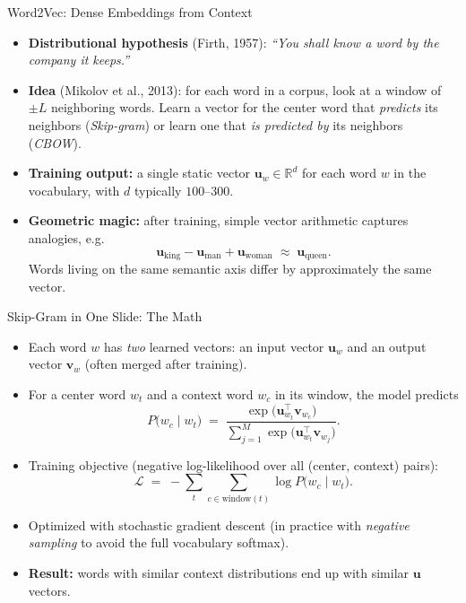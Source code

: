 \documentclass[10pt,english,aspectratio=169]{beamer}
\begin{document}
\begin{frame}{Word2Vec: Dense Embeddings from Context}
\begin{itemize}
\item \textbf{Distributional hypothesis} (Firth, 1957): \emph{``You shall know a word by the company it keeps.''}

\medskip
\item \textbf{Idea} (Mikolov et al., 2013): for each word in a corpus, look at a window of $\pm L$ neighboring words. Learn a vector for the center word that \emph{predicts} its neighbors (\emph{Skip-gram}) or learn one that \emph{is predicted by} its neighbors (\emph{CBOW}).

\medskip
\item \textbf{Training output:} a single static vector $\mathbf{u}_w \in \mathbb{R}^{d}$ for each word $w$ in the vocabulary, with $d$ typically $100$--$300$.

\medskip
\item \textbf{Geometric magic:} after training, simple vector arithmetic captures analogies, e.g.
\[
   \mathbf{u}_{\text{king}} - \mathbf{u}_{\text{man}} + \mathbf{u}_{\text{woman}} \;\approx\; \mathbf{u}_{\text{queen}}.
\]
Words living on the same semantic axis differ by approximately the same vector.
\end{itemize}
\end{frame}

\begin{frame}{Skip-Gram in One Slide: The Math}
\begin{itemize}
\item Each word $w$ has \emph{two} learned vectors: an input vector $\mathbf{u}_{w}$ and an output vector $\mathbf{v}_{w}$ (often merged after training).

\medskip
\item For a center word $w_t$ and a context word $w_c$ in its window, the model predicts
\[
   P\bigl(w_c \mid w_t\bigr) \;=\; \frac{\exp\bigl(\mathbf{u}_{w_t}^{\top} \mathbf{v}_{w_c}\bigr)}{\sum_{j=1}^{M}\exp\bigl(\mathbf{u}_{w_t}^{\top} \mathbf{v}_{w_j}\bigr)}.
\]

\medskip
\item Training objective (negative log-likelihood over all (center, context) pairs):
\[
   \mathcal{L} \;=\; -\sum_{t}\sum_{c \in \text{window}(t)} \log P\bigl(w_c \mid w_t\bigr).
\]

\medskip
\item Optimized with stochastic gradient descent (in practice with \emph{negative sampling} to avoid the full vocabulary softmax).

\medskip
\item \textbf{Result:} words with similar context distributions end up with similar $\mathbf{u}$ vectors.
\end{itemize}
\end{frame}
\end{document}
